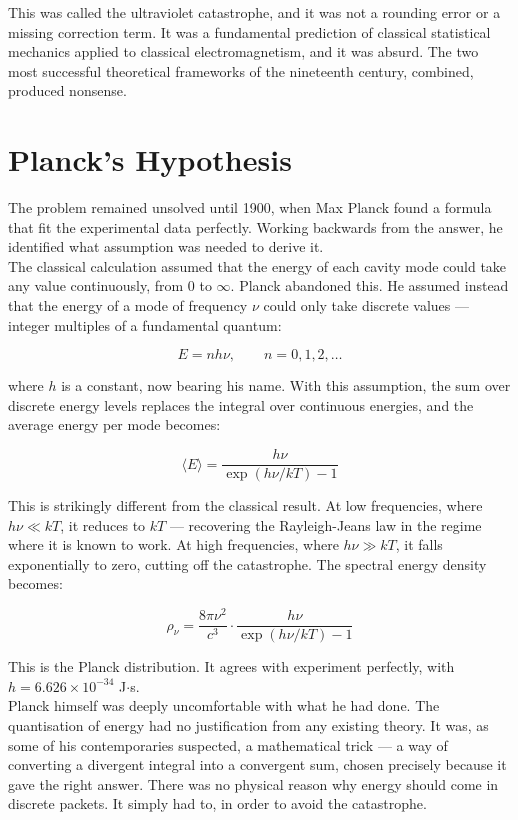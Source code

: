 \documentclass[krantz1,ChapterTOCs]{krantz}
\begin{document}
This was called the ultraviolet catastrophe, and it was not a 
rounding error or a missing correction term. It was a fundamental 
prediction of classical statistical mechanics applied to classical 
electromagnetism, and it was absurd. The two most successful 
theoretical frameworks of the nineteenth century, combined, produced 
nonsense.\\

\section*{Planck's Hypothesis}

The problem remained unsolved until 1900, when Max Planck found a 
formula that fit the experimental data perfectly. Working backwards 
from the answer, he identified what assumption was needed to derive 
it.\\

The classical calculation assumed that the energy of each cavity mode 
could take any value continuously, from $0$ to $\infty$. Planck 
abandoned this. He assumed instead that the energy of a mode of 
frequency $\nu$ could only take discrete values --- integer multiples 
of a fundamental quantum:

$$E = nh\nu, \qquad n = 0, 1, 2, \ldots$$

where $h$ is a constant, now bearing his name. With this assumption, 
the sum over discrete energy levels replaces the integral over 
continuous energies, and the average energy per mode becomes:

$$\langle E \rangle = \frac{h\nu}{\exp(h\nu / kT) - 1}$$

This is strikingly different from the classical result. At low 
frequencies, where $h\nu \ll kT$, it reduces to $kT$ --- recovering 
the Rayleigh-Jeans law in the regime where it is known to work. At 
high frequencies, where $h\nu \gg kT$, it falls exponentially to 
zero, cutting off the catastrophe. The spectral energy density 
becomes:

$$\rho_\nu = \frac{8\pi\nu^2}{c^3} \cdot \frac{h\nu}{\exp(h\nu/kT) - 1}$$

This is the Planck distribution. It agrees with experiment perfectly, 
with $h = 6.626 \times 10^{-34}$ J$\cdot$s.\\

Planck himself was deeply uncomfortable with what he had done. The 
quantisation of energy had no justification from any existing theory. 
It was, as some of his contemporaries suspected, a mathematical trick 
--- a way of converting a divergent integral into a convergent sum, 
chosen precisely because it gave the right answer. There was no 
physical reason why energy should come in discrete packets. It simply 
had to, in order to avoid the catastrophe.\\
\end{document}
